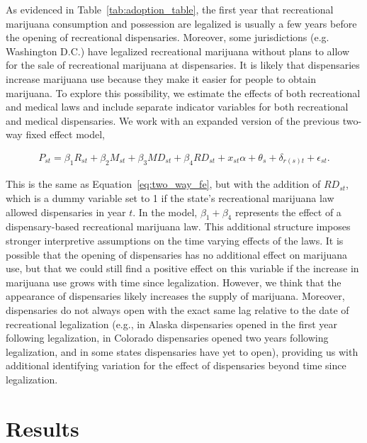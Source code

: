 \documentclass[12pt]{article}%
\begin{document}
As evidenced in Table~\ref{tab:adoption_table}, the first year that recreational marijuana consumption and possession are legalized is usually a few years before the opening of recreational dispensaries. Moreover, some jurisdictions (e.g. Washington D.C.) have legalized recreational marijuana without plans to allow for the sale of recreational marijuana at dispensaries. It is likely that dispensaries increase marijuana use because they make it easier for people to obtain marijuana. To explore this possibility, we estimate the effects of both recreational and medical laws and include separate indicator variables for both recreational and medical dispensaries. We work with an expanded version of the previous two-way fixed effect model,

\begin{align}
P_{st}=\beta_1 R_{st}+\beta_2 M_{st}+\beta_3 MD_{st} +\beta_4 RD_{st}+x_{st} \alpha+\theta_s+\delta_{r(s)t}+\epsilon_{st}. \label{eq:two_way_fe_disp}
\end{align}

This is the same as Equation~\ref{eq:two_way_fe}, but with the addition of $RD_{st}$, which is a dummy variable set to 1 if the state’s recreational marijuana law allowed dispensaries in year $t$. In the model, $\beta_1+\beta_4$ represents the effect of a dispensary-based recreational marijuana law. This additional structure imposes stronger interpretive assumptions on the time varying effects of the laws. It is possible that the opening of dispensaries has no additional effect on marijuana use, but that we could still find a positive effect on this variable if the increase in marijuana use grows with time since legalization. However, we think that the appearance of dispensaries likely increases the supply of marijuana. Moreover,  dispensaries do not always open with the exact same lag relative to the date of recreational legalization (e.g., in Alaska dispensaries opened in the first year following legalization, in Colorado dispensaries opened two years following legalization,  and in some states dispensaries have yet to open), providing us with additional identifying variation for the effect of dispensaries beyond time since legalization.

\section{Results} 
\label{sec:Results}
\end{document}

